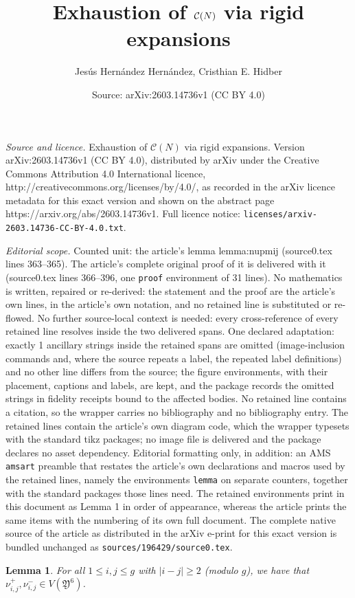 \documentclass[10pt,a4paper]{amsart}
\title{Exhaustion of $\cg{N}$ via rigid expansions}
\author{Jes\'us Hern\'andez Hern\'andez, Cristhian E. Hidber}
\date{Source: arXiv:2603.14736v1 (CC BY 4.0)}
\newcommand*{\cg}[1]{\mathcal{C}(#1)}
\newtheorem{lemma}{Lemma}
\newcommand*{\Y}{\mathfrak{Y}}
\begin{document}
\maketitle

\noindent\emph{Source and licence.} Exhaustion of $\cg{N}$ via rigid expansions. Version arXiv:2603.14736v1 (CC BY 4.0), distributed by arXiv under the Creative Commons Attribution 4.0 International licence, http://creativecommons.org/licenses/by/4.0/, as recorded in the arXiv licence metadata for this exact version and shown on the abstract page https://arxiv.org/abs/2603.14736v1. Full licence notice: \texttt{licenses/arxiv-2603.14736-CC-BY-4.0.txt}.\par\smallskip

\noindent\textit{Editorial scope.} Counted unit: the article's lemma lemma:nupmij (source0.tex lines 363--365). The article's complete original proof of it is delivered with it (source0.tex lines 366--396, one \texttt{proof} environment of 31 lines). No mathematics is written, repaired or re-derived: the statement and the proof are the article's own lines, in the article's own notation, and no retained line is substituted or re-flowed.  No further source-local context is needed: every cross-reference of every retained line resolves inside the two delivered spans.  One declared adaptation: exactly 1 ancillary strings inside the retained spans are omitted (image-inclusion commands and, where the source repeats a label, the repeated label definitions) and no other line differs from the source; the figure environments, with their placement, captions and labels, are kept, and the package records the omitted strings in fidelity receipts bound to the affected bodies.  No retained line contains a citation, so the wrapper carries no bibliography and no bibliography entry.  The retained lines contain the article's own diagram code, which the wrapper typesets with the standard tikz packages; no image file is delivered and the package declares no asset dependency.  Editorial formatting only, in addition: an AMS \texttt{amsart} preamble that restates the article's own declarations and macros used by the retained lines, namely the environments \texttt{lemma} on separate counters, together with the standard packages those lines need.  The retained environments print in this document as Lemma 1 in order of appearance, whereas the article prints the same items with the numbering of its own full document.  The complete native source of the article as distributed in the arXiv e-print for this exact version is bundled unchanged as \texttt{sources/196429/source0.tex}.
\begin{lemma}\label{lemma:nupmij}
 For all $1 \leq i,j \leq g$ with $|i-j|\geq 2$ (modulo $g$), we have that $\nu^{+}_{i,j}, \nu^{-}_{i,j} \in V(\Y^{6})$.
\end{lemma}
\end{document}
